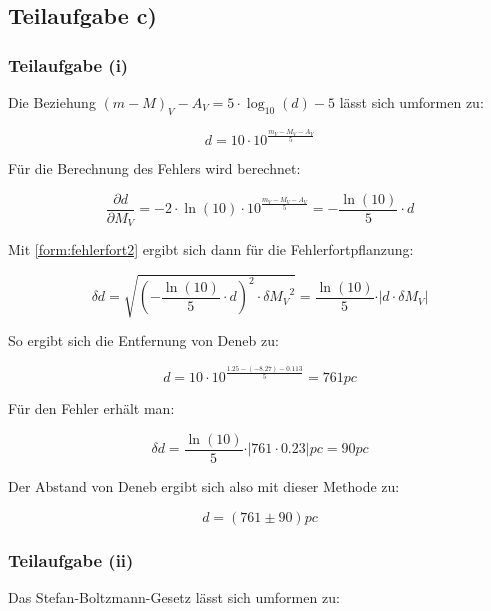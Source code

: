 \documentclass[titlepage]{scrartcl}
\begin{document}
\subsection{Teilaufgabe c)}
\subsubsection{Teilaufgabe (i)}
Die Beziehung $ (m - M)_V - A_V = 5 \cdot \log_{10} (d) - 5 $ lässt sich umformen zu:

\begin{equation}
d = 10 \cdot {10}^{\frac{m_V - M_V - A_V}{5}}
\end{equation}

Für die Berechnung des Fehlers wird berechnet:

\begin{equation}
\frac{\partial d}{\partial M_V} = -2 \cdot \ln (10) \cdot {10}^{\frac{m_V - M_V - A_V}{5}} = - \frac{\ln (10)}{5} \cdot d
\label{form:fehlerfort2}
\end{equation}

Mit \eqref{form:fehlerfort2} ergibt sich dann für die Fehlerfortpflanzung:

\begin{equation}
\delta d = \sqrt{(- \frac{\ln (10)}{5} \cdot d)^2 \cdot {\delta M_V}^2} = \frac{\ln (10)}{5} \cdot \vert d \cdot \delta M_V \vert
\end{equation}

So ergibt sich die Entfernung von Deneb zu:

\begin{equation}
d = 10 \cdot {10}^{\frac{1.25 - (-8.27) - 0.113}{5}} = 761 pc
\end{equation}

Für den Fehler erhält man:

\begin{equation}
\delta d = \frac{\ln (10)}{5} \cdot \vert 761 \cdot 0.23 \vert pc = 90 pc
\end{equation}

Der Abstand von Deneb ergibt sich also mit dieser Methode zu:

\begin{equation}
d = (761 \pm 90) pc
\end{equation}

\subsubsection{Teilaufgabe (ii)}
Das Stefan-Boltzmann-Gesetz lässt sich umformen zu:
\end{document}
